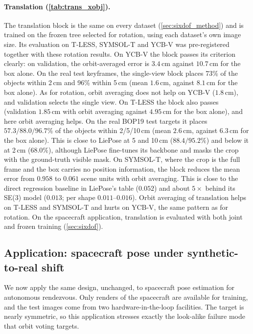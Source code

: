 \paragraph{Translation (\cref{tab:trans_xobj}).} The translation block is the same on every dataset (\cref{sec:sixdof_method}) and is trained on the frozen tree selected for rotation, using each dataset's own image size. Its evaluation on T-LESS, SYMSOL-T and YCB-V was pre-registered together with these rotation results. On YCB-V the block passes its criterion clearly: on validation, the orbit-averaged error is $3.4$\,cm against $10.7$\,cm for the box alone. On the real test keyframes, the single-view block places 73\% of the objects within 2\,cm and 96\% within 5\,cm (mean $1.6$\,cm, against $8.1$\,cm for the box alone). As for rotation, orbit averaging does not help on YCB-V ($1.8$\,cm), and validation selects the single view. On T-LESS the block also passes (validation $1.85$\,cm with orbit averaging against $4.95$\,cm for the box alone), and here orbit averaging helps. On the real BOP19 test targets it places $57.3/88.0/96.7\%$ of the objects within 2/5/10\,cm (mean $2.6$\,cm, against $6.3$\,cm for the box alone). This is close to LiePose at 5 and 10\,cm ($88.4/95.2\%$) and below it at 2\,cm ($68.0\%$), although LiePose fine-tunes its backbone and masks the crop with the ground-truth visible mask. On SYMSOL-T, where the crop is the full frame and the box carries no position information, the block reduces the mean error from $0.958$ to $0.061$ scene units with orbit averaging. This is close to the direct regression baseline in LiePose's table ($0.052$) and about $5\times$ behind its SE(3) model ($0.013$; per shape $0.011$--$0.016$). Orbit averaging of translation helps on T-LESS and SYMSOL-T and hurts on YCB-V, the same pattern as for rotation. On the spacecraft application, translation is evaluated with both joint and frozen training (\cref{sec:sixdof}).

\subsection{Application: spacecraft pose under synthetic-to-real shift}
\label{sec:spp}
We now apply the same design, unchanged, to spacecraft pose estimation for autonomous rendezvous. Only renders of the spacecraft are available for training, and the test images come from two hardware-in-the-loop facilities. The target is nearly symmetric, so this application stresses exactly the look-alike failure mode that orbit voting targets.

